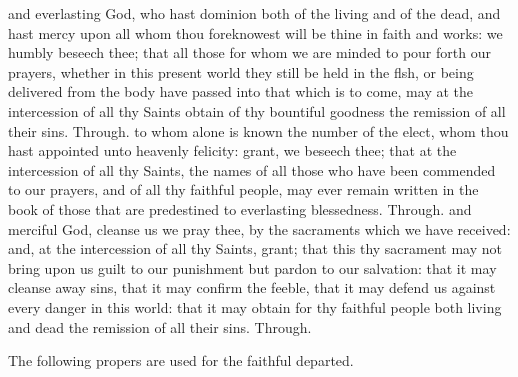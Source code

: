 \begin{multicols}{2}
 and everlasting God, who hast dominion both of the living and of the dead, and hast mercy upon all whom thou foreknowest will be thine in faith and works: we humbly beseech thee; that all those for whom we are minded to pour forth our prayers, whether in this present world they still be held in the flsh, or being delivered from the body have passed into that which is to come, may at the intercession of all thy Saints obtain of thy bountiful goodness the remission of all their sins. Through.
 to whom alone is known the number of the elect, whom thou hast appointed unto heavenly felicity: grant, we beseech thee; that at the intercession of all thy Saints, the names of all those who have been commended to our prayers, and of all thy faithful people, may ever remain written in the book of those that are predestined to everlasting blessedness. Through.
 and merciful God, cleanse us we pray thee, by the sacraments which we have received: and, at the intercession of all thy Saints, grant; that this thy sacrament may not bring upon us guilt to our punishment but pardon to our salvation: that it may cleanse away sins, that it may confirm the feeble, that it may defend us against every danger in this world: that it may obtain for thy
faithful people both living and dead the remission of all their sins. Through.
\end{multicols}
\vspace{-1ex}
\begin{rubric}
    The following propers are used for the faithful departed.
\end{rubric}
\vspace{-1.5ex}
